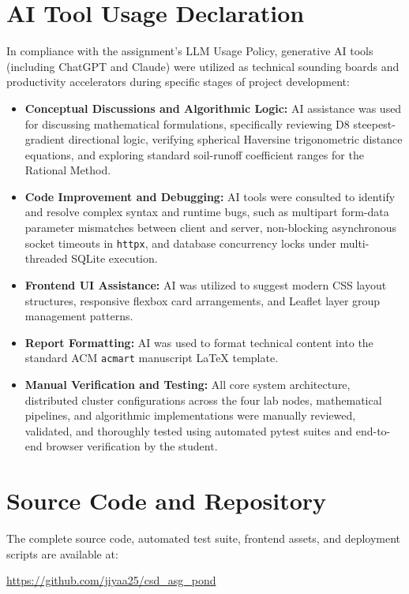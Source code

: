 \documentclass[manuscript,screen,review]{acmart}
\begin{document}
\section{AI Tool Usage Declaration}
\label{sec:ai-usage}
In compliance with the assignment's LLM Usage Policy, generative AI tools (including ChatGPT and Claude) were utilized as technical sounding boards and productivity accelerators during specific stages of project development:
\begin{itemize}
    \item \textbf{Conceptual Discussions and Algorithmic Logic:} AI assistance was used for discussing mathematical formulations, specifically reviewing D8 steepest-gradient directional logic, verifying spherical Haversine trigonometric distance equations, and exploring standard soil-runoff coefficient ranges for the Rational Method.
    \item \textbf{Code Improvement and Debugging:} AI tools were consulted to identify and resolve complex syntax and runtime bugs, such as multipart form-data parameter mismatches between client and server, non-blocking asynchronous socket timeouts in \texttt{httpx}, and database concurrency locks under multi-threaded SQLite execution.
    \item \textbf{Frontend UI Assistance:} AI was utilized to suggest modern CSS layout structures, responsive flexbox card arrangements, and Leaflet layer group management patterns.
    \item \textbf{Report Formatting:} AI was used to format technical content into the standard ACM \texttt{acmart} manuscript LaTeX template.
    \item \textbf{Manual Verification and Testing:} All core system architecture, distributed cluster configurations across the four lab nodes, mathematical pipelines, and algorithmic implementations were manually reviewed, validated, and thoroughly tested using automated pytest suites and end-to-end browser verification by the student.
\end{itemize}

\appendix

\section{Source Code and Repository}
The complete source code, automated test suite, frontend assets, and deployment scripts are available at:
\begin{center}
\url{https://github.com/jiyaa25/csd_asg_pond}
\end{center}
\end{document}
